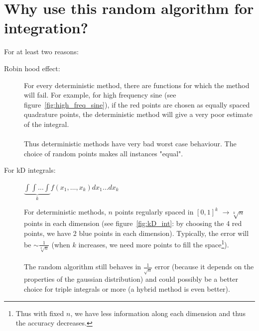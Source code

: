 \section{Why use this random algorithm for integration?}
For at least two reasons:
\begin{description}
\item[Robin hood effect: ] For every deterministic method, there are functions for which the method will fail. For example, for high frequency sine (see figure~\ref{fig:high_freq_sine}), if the red points are chosen as equally spaced quadrature points, the deterministic method will give a very poor estimate of the integral.
\paragraph{}
Thus deterministic methods have very bad worst case behaviour. The choice of random points makes all instances "equal".
\item[For kD integrals: ] $\underbrace{\int \int \hdots \int}_{k} f(x_1,\hdots,x_k)dx_1\hdots dx_{k}$

For deterministic methods, $n$ points regularly spaced in $[0,1]^k$ $\rightarrow \sqrt[k]{n}$ points in each dimension (see figure~\ref{fig:kD_int}: by choosing the 4 red points, we have 2 blue points in each dimension). Typically, the error will be $\sim \frac{1}{\sqrt[k]{n}}$ (when $k$ increases, we need more points to fill the space\footnote{Thus with fixed $n$, we have less information along each dimension and thus the accuracy decreases.}).

\paragraph{}
The random algorithm still behaves in $\frac{1}{\sqrt{n}}$ error (because it depends on the properties of the gaussian distribution) and could possibly be a better choice for triple integrals or more (a hybrid method is even better).
\end{description}

